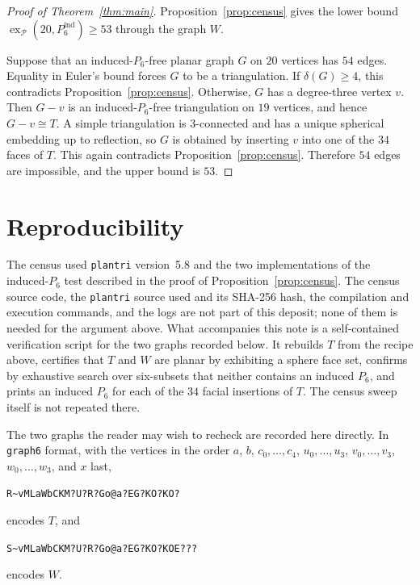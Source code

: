 \documentclass[11pt]{amsart}
\newcommand{\cP}{\mathcal P}
\newcommand{\exP}{\operatorname{ex}_{\cP}}
\newcommand{\ind}{\mathrm{ind}}
\begin{document}
\begin{proof}[Proof of Theorem~\ref{thm:main}]
Proposition~\ref{prop:census} gives the lower bound
$\exP(20,P_6^{\ind})\geq 53$ through the graph $W$.

Suppose that an induced-$P_6$-free planar graph $G$ on $20$ vertices has
$54$ edges. Equality in Euler's bound forces $G$ to be a triangulation.
If $\delta(G)\geq 4$, this contradicts Proposition~\ref{prop:census}.
Otherwise, $G$ has a degree-three vertex $v$. Then $G-v$ is an
induced-$P_6$-free triangulation on $19$ vertices, and hence $G-v\cong T$.
A simple triangulation is $3$-connected and has a unique spherical embedding
up to reflection, so $G$ is obtained by inserting $v$ into one of the
$34$ faces of $T$. This again contradicts
Proposition~\ref{prop:census}. Therefore $54$ edges are impossible, and
the upper bound is $53$.
\end{proof}

\section*{Reproducibility}

The census used \texttt{plantri} version~5.8 \cite{Plantri} and the two
implementations of the induced-$P_6$ test described in the proof of
Proposition~\ref{prop:census}. The census source code, the \texttt{plantri}
source used and its SHA-256 hash, the compilation and execution commands, and
the logs are not part of this deposit; none of them is needed for the argument
above. What accompanies this note is a self-contained verification script for
the two graphs recorded below. It rebuilds $T$ from the recipe above, certifies
that $T$ and $W$ are planar by exhibiting a sphere face set, confirms by
exhaustive search over six-subsets that neither contains an induced $P_6$, and
prints an induced $P_6$ for each of the $34$ facial insertions of $T$. The
census sweep itself is not repeated there.

The two graphs the reader may wish to recheck are recorded here directly. In
\texttt{graph6} format, with the vertices in the order
$a$, $b$, $c_0,\ldots,c_4$, $u_0,\ldots,u_3$, $v_0,\ldots,v_3$,
$w_0,\ldots,w_3$, and $x$ last,
\begin{center}
\verb+R~vMLaWbCKM?U?R?Go@a?EG?KO?KO?+
\end{center}
encodes $T$, and
\begin{center}
\verb+S~vMLaWbCKM?U?R?Go@a?EG?KO?KOE???+
\end{center}
encodes $W$.
\end{document}
